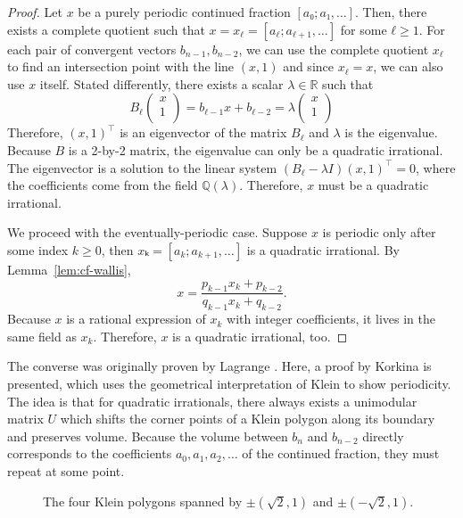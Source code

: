 \begin{proof}
  Let $x$ be a purely periodic continued fraction $[a₀; a₁, …]$.
  Then, there exists a complete quotient such that $x = x_ℓ = [a_ℓ; a_{ℓ+1}, …]$ for some $ℓ ≥ 1$.
  For each pair of convergent vectors $b_{n-1}, b_{n-2}$, we can use the
  complete quotient $x_ℓ$ to find an intersection point with the line $(x, 1)$
  and since $x_ℓ = x$, we can also use $x$ itself.
  Stated differently, there exists a scalar $λ ∈ ℝ$ such that
  \[
    B_ℓ
    \begin{pmatrix}
      x \\
      1 \\
    \end{pmatrix}
    =
    b_{ℓ-1} x + b_{ℓ-2}
    = λ
    \begin{pmatrix}
      x \\
      1 \\
    \end{pmatrix}
  \]
  Therefore, $(x, 1)^⊤$ is an eigenvector of the matrix $B_ℓ$
  and $λ$ is the eigenvalue.
  Because $B$ is a 2-by-2 matrix,
  the eigenvalue can only be a quadratic irrational.
  The eigenvector is a solution to the linear system $(B_ℓ - λ I) (x, 1)^⊤ = 0$,
  where the coefficients come from the field $ℚ(λ)$.
  Therefore, $x$ must be a quadratic irrational.

  We proceed with the eventually-periodic case.
  Suppose $x$ is periodic only after some index $k ≥ 0$,
  then $xₖ = [a_k; a_{k+1}, …]$ is a quadratic irrational.
  By Lemma~\ref{lem:cf-wallis},
  \[
    x = \frac{p_{k-1} x_k + p_{k-2}}{q_{k-1} x_k + q_{k-2}}.
  \]
  Because $x$ is a rational expression of $x_k$ with integer coefficients,
  it lives in the same field as $x_k$.
  Therefore, $x$ is a quadratic irrational, too.
\end{proof}

The converse was originally proven by Lagrange \cite{Lagrange70}.
Here, a proof by Korkina \cite{Korkina96} is presented,
which uses the geometrical interpretation of Klein to show periodicity.
The idea is that for quadratic irrationals,
there always exists a unimodular matrix $U$ which shifts the corner points of a
Klein polygon along its boundary and preserves volume.
Because the volume between $b_n$ and $b_{n-2}$ directly corresponds to
the coefficients $a_0, a_1, a_2, …$ of the continued fraction,
they must repeat at some point.

\begin{figure}[tb]
  \centering
  
  \caption{
    The four Klein polygons spanned by $±(\sqrt{2}, 1)$ and $±(-\sqrt{2}, 1)$.
  }
  \label{fig:full-klein-polygon}
\end{figure}

